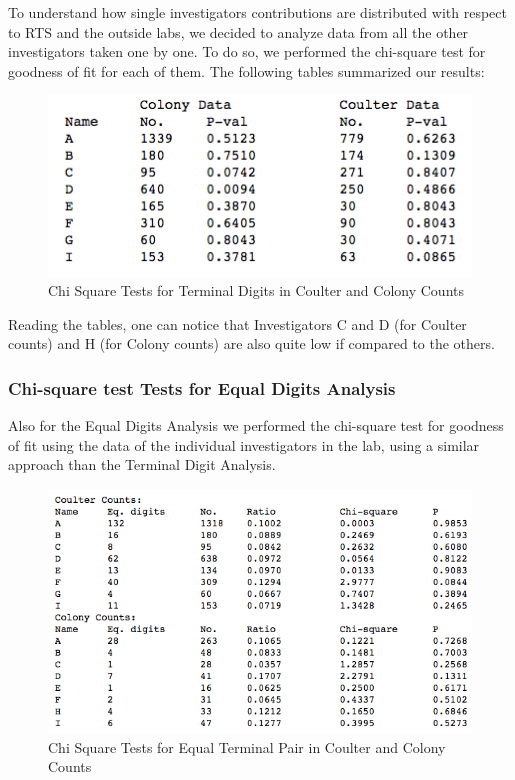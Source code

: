 \documentclass{article}
\begin{document}
To understand how single investigators contributions are distributed
with respect to RTS and the outside labs, we decided to analyze data
from all the other investigators taken one by one. To do so, we
performed the chi-square test for goodness of fit for each of them. The
following tables summarized our results:

\begin{figure}[H]
\centering
\includegraphics[width=0.7\linewidth]{images/raaz_term_chi_summary.png}
\caption{Chi Square Tests for Terminal Digits in Coulter and Colony
Counts}
\end{figure}

Reading the tables, one can notice that Investigators C and D (for
Coulter counts) and H (for Colony counts) are also quite low if compared
to the others.

    \subsubsection{Chi-square test Tests for Equal Digits
Analysis}\label{chi-square-test-tests-for-equal-digits-analysis}

Also for the Equal Digits Analysis we performed the chi-square test for
goodness of fit using the data of the individual investigators in the
lab, using a similar approach than the Terminal Digit Analysis.
\begin{figure}[H]
\centering
\includegraphics[width=0.9\linewidth]{images/raaz_eq_chi_elaborate.png}
\caption{Chi Square Tests for Equal Terminal Pair in Coulter and Colony
Counts}
\end{figure}
\end{document}
